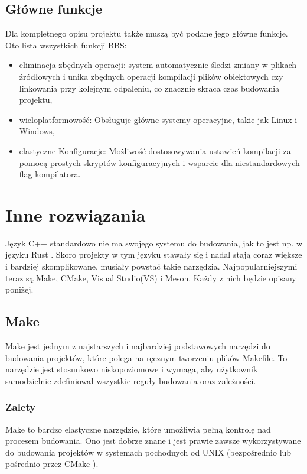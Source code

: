 \subsection{Główne funkcje}
Dla kompletnego opisu projektu także muszą być podane jego główne funkcje. Oto lista wszystkich funkcji BBS:

\begin{itemize}
    \item eliminacja zbędnych operacji: system automatycznie śledzi zmiany w plikach źródłowych i unika zbędnych operacji kompilacji plików obiektowych czy linkowania przy kolejnym odpaleniu, co znacznie skraca czas budowania projektu,
    \item wieloplatformowość: Obsługuje główne systemy operacyjne, takie jak Linux i Windows,
    \item elastyczne Konfiguracje: Możliwość dostosowywania ustawień kompilacji za pomocą prostych skryptów konfiguracyjnych i wsparcie dla niestandardowych flag kompilatora.
\end{itemize}

\section{Inne rozwiązania}
Język C++ standardowo nie ma swojego systemu do budowania, jak to jest np. w języku Rust \cite{rust-cargo}. Skoro projekty w tym języku stawały się i nadal stają coraz większe i bardziej skomplikowane, musiały powstać takie narzędzia. Najpopularniejszymi teraz są Make, CMake, Visual Studio(VS) i Meson. Każdy z nich będzie opisany poniżej.

\subsection{Make}
Make\cite{make} jest jednym z najstarszych i najbardziej podstawowych narzędzi do budowania projektów, które polega na ręcznym tworzeniu plików Makefile. To narzędzie jest stosunkowo niskopoziomowe i wymaga, aby użytkownik samodzielnie zdefiniował wszystkie reguły budowania oraz zależności.

\subsubsection{Zalety}
Make to bardzo elastyczne narzędzie, które umożliwia pełną kontrolę nad procesem budowania. Ono jest dobrze znane i jest prawie zawsze wykorzystywane do budowania projektów w systemach pochodnych od UNIX (bezpośrednio lub pośrednio przez CMake \cite{cmake}). 

